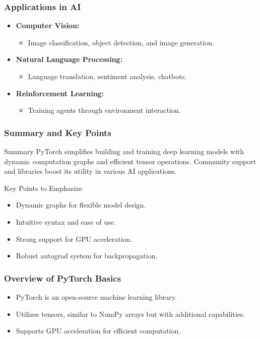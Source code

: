 \documentclass[aspectratio=169]{beamer}
\begin{document}
\begin{frame}[fragile]
    \frametitle{Applications in AI}
    \begin{itemize}
        \item \textbf{Computer Vision:} 
        \begin{itemize}
            \item Image classification, object detection, and image generation.
        \end{itemize}

        \item \textbf{Natural Language Processing:}
        \begin{itemize}
            \item Language translation, sentiment analysis, chatbots.
        \end{itemize}

        \item \textbf{Reinforcement Learning:}
        \begin{itemize}
            \item Training agents through environment interaction.
        \end{itemize}
    \end{itemize}
\end{frame}

\begin{frame}[fragile]
    \frametitle{Summary and Key Points}
    \begin{block}{Summary}
        PyTorch simplifies building and training deep learning models with dynamic computation graphs and efficient tensor operations. Community support and libraries boost its utility in various AI applications.
    \end{block}
    
    \begin{block}{Key Points to Emphasize}
        \begin{itemize}
            \item Dynamic graphs for flexible model design.
            \item Intuitive syntax and ease of use.
            \item Strong support for GPU acceleration.
            \item Robust autograd system for backpropagation.
        \end{itemize}
    \end{block}
\end{frame}

\begin{frame}[fragile]
    \frametitle{Overview of PyTorch Basics}
    \begin{itemize}
        \item PyTorch is an open-source machine learning library.
        \item Utilizes tensors, similar to NumPy arrays but with additional capabilities.
        \item Supports GPU acceleration for efficient computation.
    \end{itemize}
\end{frame}
\end{document}

